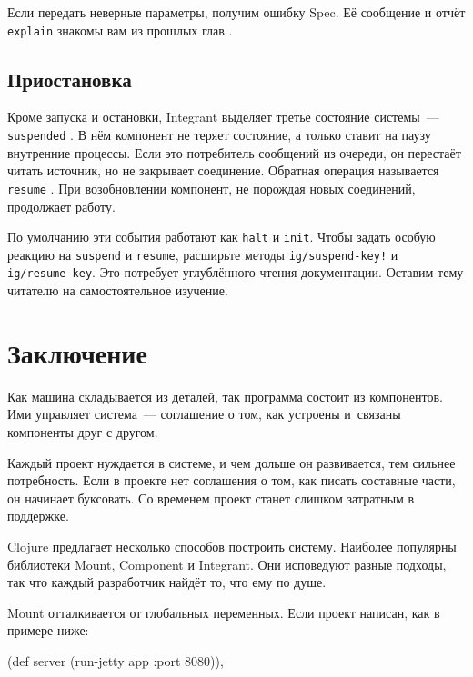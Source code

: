 \fi

\noindent
Если передать неверные параметры, получим ошибку Spec. Её сообщение и
отчёт \verb|explain| знакомы вам из прошлых глав .

\subsection{Приостановка}


Кроме запуска и остановки, Integrant выделяет третье состояние системы~---
\verb|suspended| . В нём компонент не теряет состояние, а
только ставит на паузу внутренние процессы. Если это потребитель сообщений из
очереди, он перестаёт читать источник, но не закрывает соединение. Обратная
операция называется \verb|resume| . При возобновлении
компонент, не порождая новых соединений, продолжает работу.

\mnoindent
По умолчанию эти события работают как \verb|halt| и \verb|init|. Чтобы
задать особую реакцию на \verb|suspend| и \verb|resume|, расширьте методы
\texttt{ig/sus\-pend\--key!} и \verb|ig/resume-key|. Это потребует углублённого
чтения документации. Оставим тему читателю на самостоятельное изучение.

\section{Заключение}

Как машина складывается из деталей, так программа состоит из компонентов. Ими
управляет система~--- соглашение о том, как устроены и~связаны компоненты друг с
другом.

Каждый проект нуждается в системе, и чем дольше он развивается, тем сильнее
потребность. Если в проекте нет соглашения о том, как писать составные части, он
начинает буксовать. Со временем проект станет слишком затратным в поддержке.

Clojure предлагает несколько способов построить систему. Наиболее популярны
библиотеки Mount, Component и Integrant. Они исповедуют разные подходы, так что
каждый разработчик найдёт то, что ему по душе.

Mount отталкивается от глобальных переменных. Если проект написан, как в примере
ниже:

\ifx\DEVICETYPE\MOBILE

\begin{english}
  \begin{clojure}
(def server
  (run-jetty app {:port 8080})),
  \end{clojure}
\end{english}

